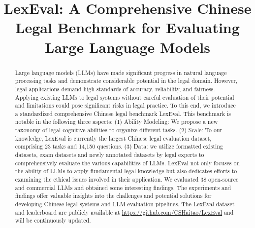 \title{LexEval: A Comprehensive Chinese Legal Benchmark for Evaluating Large Language Models}



\maketitle

\begin{abstract}
Large language models (LLMs) have made significant progress in natural language processing tasks and demonstrate considerable potential in the legal domain.  However, legal applications demand high standards of accuracy, reliability, and fairness. Applying existing LLMs to legal systems without careful evaluation of their potential and limitations could pose significant risks in legal practice.
To this end, we introduce a standardized comprehensive Chinese legal benchmark LexEval.
This benchmark is notable in the following three aspects: (1) Ability Modeling: We propose a new taxonomy of legal cognitive abilities to organize different tasks. (2) Scale: To our knowledge, LexEval is currently the largest Chinese legal evaluation dataset, comprising 23 tasks and 14,150 questions. (3) Data: we utilize formatted existing datasets, exam datasets and newly annotated datasets by legal experts to comprehensively evaluate the various capabilities of LLMs.
LexEval not only focuses on the ability of LLMs to apply fundamental legal knowledge but also dedicates efforts to examining the ethical issues involved in their application.
We evaluated 38 open-source and commercial LLMs and obtained some interesting findings. 
The experiments and findings offer valuable insights into the challenges and potential solutions for developing Chinese legal systems and LLM evaluation pipelines.
The LexEval dataset and leaderboard are publicly available at 
\url{https://github.com/CSHaitao/LexEval} and will be continuously updated. 

\end{abstract}

